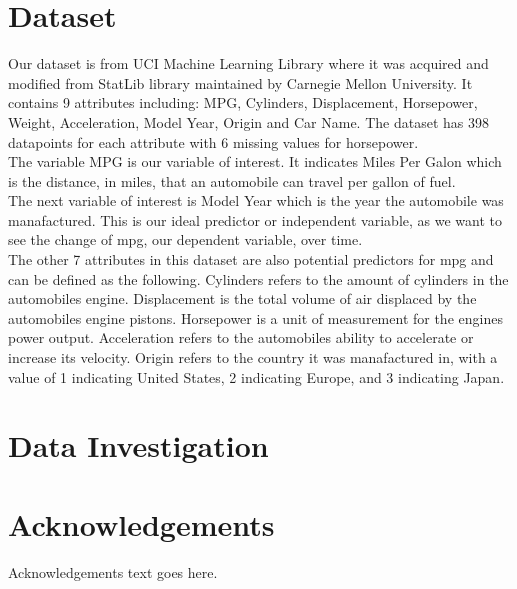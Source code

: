 \documentclass[journal]{IEEEtran}
\begin{document}
\section{Dataset}
Our dataset is from UCI Machine Learning Library where it was acquired and modified from StatLib library maintained by Carnegie Mellon University.
It contains 9 attributes including: MPG, Cylinders, Displacement, Horsepower, Weight, Acceleration, Model Year, Origin and Car Name.
The dataset has 398 datapoints for each attribute with 6 missing values for horsepower.
\\
The variable MPG is our variable of interest. 
It indicates Miles Per Galon which is the distance, in miles, that an automobile can travel per gallon of fuel.
\\
The next variable of interest is Model Year which is the year the automobile was manafactured.
This is our ideal predictor or independent variable, as we want to see the change of mpg, our dependent variable, over time.
\\
The other 7 attributes in this dataset are also potential predictors for mpg and can be defined as the following. 
Cylinders refers to the amount of cylinders in the automobiles engine.
Displacement is the total volume of air displaced by the automobiles engine pistons.
Horsepower is a unit of measurement for the engines power output.
Acceleration refers to the automobiles ability to accelerate or increase its velocity.
Origin refers to the country it was manafactured in, with a value of 1 indicating United States, 2 indicating Europe, and 3 indicating Japan.
\\
\section{Data Investigation}


\section*{Acknowledgements}
Acknowledgements text goes here.




\end{document}
